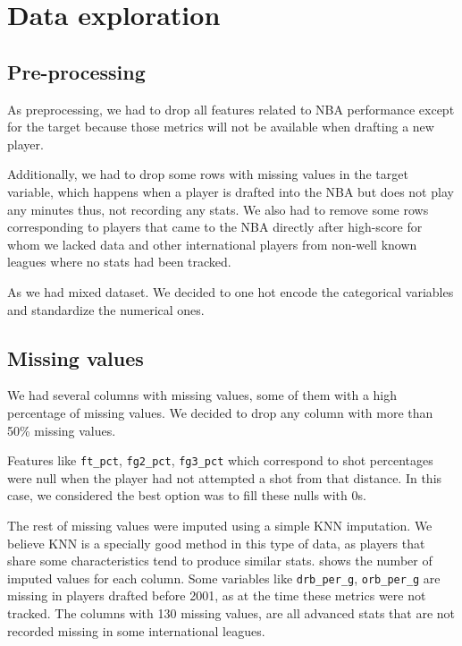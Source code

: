 
\section{Data exploration}%
\label{sec:data-exploration}

\subsection{Pre-processing}%
\label{sub:pre-processing}

As preprocessing, we had to drop all features related to NBA performance except for the target because those metrics will not be available when drafting a new player. 

Additionally, we had to drop some rows with missing values in the target variable, which happens when a player is drafted into the NBA but does not play any minutes thus, not recording any stats. We also had to remove some rows corresponding to players that came to the NBA directly after high-score for whom we lacked data and other international players from non-well known leagues where no stats had been tracked.

As we had mixed dataset. We decided to one hot encode the categorical variables and standardize the numerical ones.

\subsection{Missing values}%
\label{sub:missing-values}

We had several columns with missing values, some of them with a high percentage of missing values. We decided to drop any column with more than 50\% missing values.

Features like \texttt{ft\_pct}, \texttt{fg2\_pct}, \texttt{fg3\_pct} which correspond to shot percentages were null when the player had not attempted a shot from that distance. In this case, we considered the best option was to fill these nulls with 0s.

The rest of missing values were imputed using a simple KNN imputation. We believe KNN is a specially good method in this type of data, as players that share some characteristics tend to produce similar stats.  shows the number of imputed
values for each column. Some variables like \texttt{drb\_per\_g}, \texttt{orb\_per\_g} are missing in players drafted before 2001, as at the time these metrics were not tracked. The columns with 130 missing values, are all advanced stats that are not recorded missing in some international leagues.

